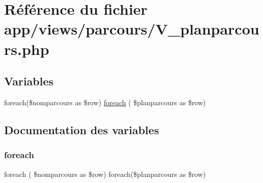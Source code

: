 \hypertarget{_v__planparcours_8php}{}\section{Référence du fichier app/views/parcours/\+V\+\_\+planparcours.php}
\label{_v__planparcours_8php}
\subsection*{Variables}
\begin{DoxyCompactItemize}
\item 
foreach(\$nomparcours as \$row) \hyperlink{_v__planparcours_8php_af0b968d00a3257dd6863760515709b30}{foreach} ( \$planparcours as \$row)
\end{DoxyCompactItemize}


\subsection{Documentation des variables}
\mbox{\label{_v__planparcours_8php_af0b968d00a3257dd6863760515709b30}} 
\subsubsection{\texorpdfstring{foreach}{foreach}}
{\footnotesize\ttfamily foreach ( \$nomparcours as \$row) foreach(\$planparcours as \$row)}

